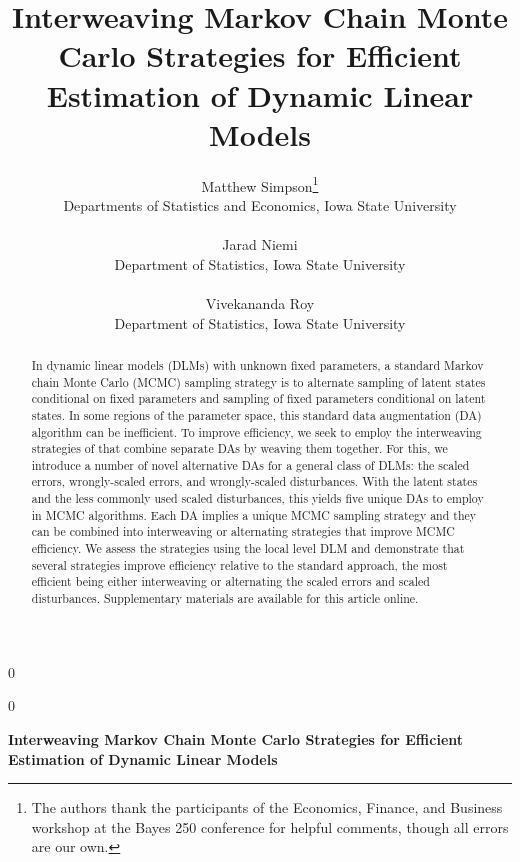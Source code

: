 \documentclass[12pt]{article}
\newcommand{\blind}{0} %
\begin{document}
\def\spacingset#1{\renewcommand{\baselinestretch}%
{#1}\small\normalsize} \spacingset{1}

\blind
{
  \title{\bf Interweaving Markov Chain Monte Carlo Strategies for Efficient
    Estimation of Dynamic Linear Models}
  \author{Matthew Simpson\thanks{
    The authors thank the participants of the Economics, Finance, and Business workshop at the Bayes 250 conference for helpful comments, though all errors are our own.}\hspace{.2cm}\\
    Departments of Statistics and Economics, Iowa State University\\~\\
    Jarad Niemi \\
    Department of Statistics, Iowa State University\\~\\
    Vivekananda Roy\\
    Department of Statistics, Iowa State University}
  \maketitle
} \fi

\blind
{
  \bigskip
  \bigskip
  \bigskip
  \begin{center}
    {\LARGE\bf Interweaving Markov Chain Monte Carlo Strategies for Efficient
    Estimation of Dynamic Linear Models}
\end{center}
  \medskip
} \fi

\bigskip


\begin{abstract}
In dynamic linear models (DLMs) with unknown fixed parameters, a standard Markov chain Monte Carlo (MCMC) sampling strategy is to alternate sampling of latent states conditional on fixed parameters and sampling of fixed parameters conditional on latent states. In some regions of the parameter space, this standard data augmentation (DA) algorithm can be inefficient. To improve efficiency, we seek to employ the interweaving strategies of \citet{yu2011center} that combine separate DAs by weaving them together. For this, we introduce a number of novel alternative DAs for a general class of DLMs: the scaled errors, wrongly-scaled errors, and wrongly-scaled disturbances. With the latent states and the less commonly used scaled disturbances, this yields five unique DAs to employ in MCMC algorithms. Each DA implies a unique MCMC sampling strategy and they can be combined into interweaving or alternating strategies that improve MCMC efficiency. We assess the strategies using the local level DLM and demonstrate that several strategies improve efficiency relative to the standard approach, the most efficient being either interweaving or alternating the scaled errors and scaled disturbances. Supplementary materials are available for this article online.
\end{abstract}
\end{document}
